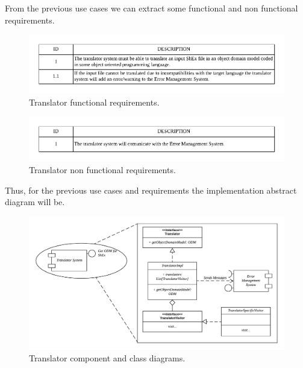 From the previous use cases we can extract some functional and non functional requirements.

\begin{figure}[h!]
    \includegraphics[width=\textwidth]{images/trans-reqf.pdf}
    \centering
    \caption[Translator functional requirements]{Translator functional requirements.}
    \label{fig:trans-reqf}
\end{figure}

\begin{figure}[h!]
    \includegraphics[width=\textwidth]{images/trans-reqnf.pdf}
    \centering
    \caption[Translator non functional requirements]{Translator non functional requirements.}
    \label{fig:trans-reqnf}
\end{figure}

Thus, for the previous use cases and requirements the implementation abstract diagram will be.

\begin{figure}[h!]
    \includegraphics[width=\textwidth]{images/trans-diagram.pdf}
    \centering
    \caption[Translator component and class diagrams]{Translator component and class diagrams.}
    \label{fig:trans-diag}
\end{figure}
